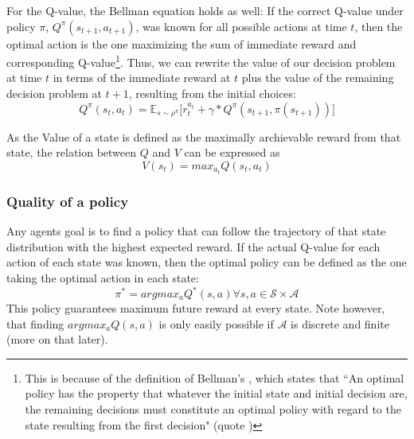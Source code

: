 For the Q-value, the Bellman equation holds as well: If the correct Q-value under policy $\pi$, $Q^\pi(s_{t+1},a_{t+1})$, was known for all possible actions at time $t$, then the optimal action is the one maximizing the sum of immediate reward and corresponding Q-value\footnote{This is because of the definition of Bellman's , which states that ``An optimal policy has the property that whatever the initial state and initial decision are, the remaining decisions must constitute an optimal policy with regard to the state resulting from the first decision"  (quote \cite{bellman_dynamic_nodate})}. Thus, we can rewrite the value of our decision problem at time $t$ in terms of the immediate reward at $t$ plus the value of the remaining decision problem at $t+1$, resulting from the initial choices:
\begin{equation} \label{bellman}
	Q^\pi(s_t,a_t) =  \mathds{E}_{s\sim\rho^\pi} \big[r_t^{a_t} + \gamma *  Q^\pi(s_{t+1},\pi(s_{t+1}))  \big]
\end{equation}

As the Value of a state is defined as the maximally archievable reward from that state, the relation between $Q$ and $V$ can be expressed as
\begin{equation} \label{eq:1.25}
V(s_t) = max_{a_t} Q(s_t, a_t)
\end{equation}

\subsubsection{Quality of a policy}

Any agents goal is to find a policy that can follow the trajectory of that state distribution with the highest expected reward. If the actual Q-value for each action of each state was known, then the optimal policy can be defined as the one taking the optimal action in each state:
\begin{equation}
	\pi^* = argmax_aQ^*(s,a) \forall s,a \in \mathcal{S} \times \mathcal{A}
\end{equation}
This policy guarantees maximum future reward at every state. Note however, that finding $argmax_aQ(s,a)$ is only easily possible if $\mathcal{A}$ is discrete and finite (more on that later). 

